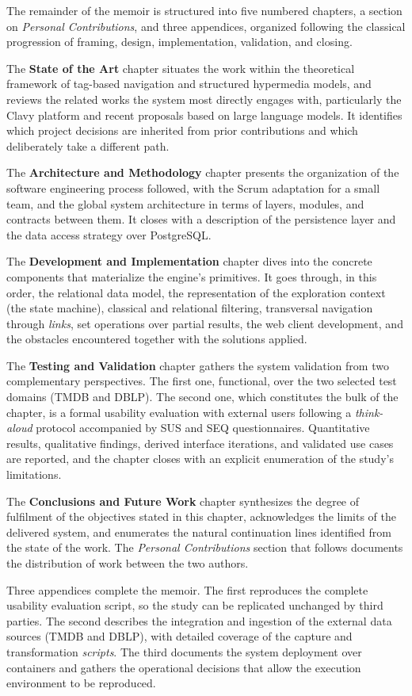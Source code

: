 The remainder of the memoir is structured into five numbered chapters, a section on
\textit{Personal Contributions}, and three appendices, organized following the classical
progression of framing, design, implementation, validation, and closing.

The \textbf{State of the Art} chapter situates the work within the theoretical framework of
tag-based navigation and structured hypermedia models, and reviews the related works the
system most directly engages with, particularly the Clavy platform and recent proposals based
on large language models. It identifies which project decisions are inherited from prior
contributions and which deliberately take a different path.

The \textbf{Architecture and Methodology} chapter presents the organization of the software
engineering process followed, with the Scrum adaptation for a small team, and the global
system architecture in terms of layers, modules, and contracts between them. It closes with a
description of the persistence layer and the data access strategy over PostgreSQL.

The \textbf{Development and Implementation} chapter dives into the concrete components that
materialize the engine's primitives. It goes through, in this order, the relational data
model, the representation of the exploration context (the state machine), classical and
relational filtering, transversal navigation through \textit{links}, set operations over
partial results, the web client development, and the obstacles encountered together with the
solutions applied.

The \textbf{Testing and Validation} chapter gathers the system validation from two
complementary perspectives. The first one, functional, over the two selected test domains
(TMDB and DBLP). The second one, which constitutes the bulk of the chapter, is a formal
usability evaluation with external users following a \textit{think-aloud} protocol accompanied
by SUS and SEQ questionnaires. Quantitative results, qualitative findings, derived interface
iterations, and validated use cases are reported, and the chapter closes with an explicit
enumeration of the study's limitations.

The \textbf{Conclusions and Future Work} chapter synthesizes the degree of fulfilment of the
objectives stated in this chapter, acknowledges the limits of the delivered system, and
enumerates the natural continuation lines identified from the state of the work. The
\textit{Personal Contributions} section that follows documents the distribution of work between
the two authors.

Three appendices complete the memoir. The first reproduces the complete usability evaluation
script, so the study can be replicated unchanged by third parties. The second describes the
integration and ingestion of the external data sources (TMDB and DBLP), with detailed coverage
of the capture and transformation \textit{scripts}. The third documents the system deployment
over containers and gathers the operational decisions that allow the execution environment to
be reproduced.
